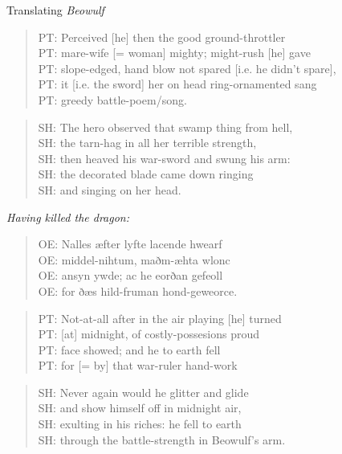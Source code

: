 \begin{exercises}{Translating \textit{Beowulf}}
\begin{quote}
PT: Perceived [he] then the good ground-throttler\\
PT: mare-wife [= woman] mighty; might-rush [he] gave\\
PT: slope-edged, hand blow not spared [i.e. he didn't spare],\\
PT: it [i.e. the sword] her on head ring-ornamented sang\\
PT: greedy battle-poem/song.
\end{quote}

\begin{quote}
SH: The hero observed that swamp thing from hell,\\
SH: the tarn-hag in all her terrible strength,\\
SH: then heaved his war-sword and swung his arm:\\
SH: the decorated blade came down ringing\\
SH: and singing on her head.\\
\citep[105]{Heaney2000}
\end{quote}

\emph{Having killed the dragon:}
\begin{quote}
OE: Nalles æfter lyfte lacende hwearf\\
OE: middel-nihtum, maðm-æhta wlonc\\
OE: ansyn ywde; ac he eorðan gefeoll\\
OE: for ðæs hild-fruman hond-geweorce.\\
\citep[190]{Heaney2000}
\end{quote}

\begin{quote}
PT: Not-at-all after in the air playing [he] turned\\
PT: [at] midnight, of costly-possesions proud\\
PT: face showed; and he to earth fell\\
PT: for [= by] that war-ruler hand-work
\end{quote}

\begin{quote}
SH: Never again would he glitter and glide\\
SH: and show himself off in midnight air,\\
SH: exulting in his riches: he fell to earth\\
SH: through the battle-strength in Beowulf's arm.\\
\citep[191]{Heaney2000}
\end{quote}


\end{exercises}

